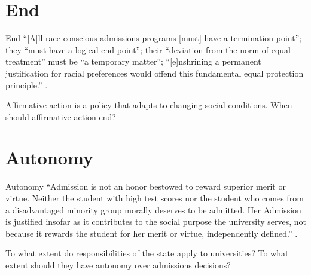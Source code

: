 \documentclass[ignorenonframetext, aspectratio=169]{beamer}
\begin{document}
\section{End}
\begin{frame}{End}
``[A]ll race-conscious admissions programs [must] have a termination point''; they ``must have a logical end point''; their ``deviation from the norm of equal treatment'' must be ``a temporary matter''; ``[e]nshrining a permanent justification for racial preferences would offend this fundamental equal protection principle.'' .

Affirmative action is a policy that adapts to changing social conditions. When should affirmative action end?
\end{frame}

\section{Autonomy}
\begin{frame}{Autonomy}
``Admission is not an honor bestowed to reward superior merit or virtue. Neither the student with high test scores nor the student who comes from a disadvantaged minority group morally deserves to be admitted. Her Admission is justified insofar as it contributes to the social purpose the university serves, not because it rewards the student for her merit or virtue, independently defined.'' .

To what extent do responsibilities of the state apply to universities? To  what extent should they have autonomy over admissions decisions?
\end{frame}
\end{document}
